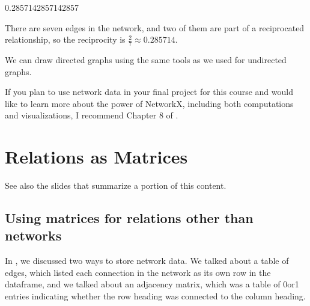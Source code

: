 \documentclass[letterpaper,10pt,english]{sphinxmanual}
\begin{document}
\begin{sphinxVerbatim}[commandchars=\\\{\}]
0.2857142857142857
\end{sphinxVerbatim}

There are seven edges in the network, and two of them are part of a reciprocated relationship, so the reciprocity is \(\frac27\approx0.285714\).

We can draw directed graphs using the same tools as we used for undirected graphs.

\begin{sphinxVerbatim}[commandchars=\\\{\}]
    
\end{sphinxVerbatim}

\noindent{}

If you plan to use network data in your final project for this course and would like to learn more about the power of NetworkX, including both computations and visualizations, I recommend Chapter 8 of .


\chapter{Relations as Matrices}
\label{\detokenize{chapter-16-matrices:relations-as-matrices}}\label{\detokenize{chapter-16-matrices::doc}}
See also the slides that summarize a portion of this content.



\section{Using matrices for relations other than networks}
\label{\detokenize{chapter-16-matrices:using-matrices-for-relations-other-than-networks}}
In {\hyperref[\detokenize{chapter-15-networks::doc}]{}}, we discussed two ways to store network data.  We talked about a table of edges, which listed each connection in the network as its own row in the dataframe, and we talked about an adjacency matrix, which was a table of 0\sphinxhyphen{}or\sphinxhyphen{}1 entries indicating whether the row heading was connected to the column heading.
\end{document}
